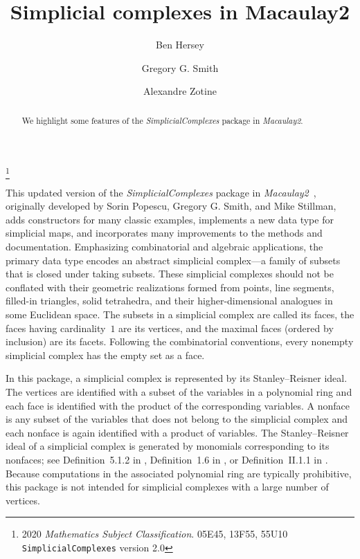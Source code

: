 \documentclass[12pt,leqno]{amsart}
\theoremstyle{definition}
\begin{document}
\vspace*{-4.5em}

\title[Simplicial Complexes]{Simplicial complexes in Macaulay2}

\author[B.~Hersey]{Ben Hersey}
\author[G.G.~Smith]{Gregory G.{} Smith} 
\author[A.~Zotine]{Alexandre Zotine}

\address{Department of Mathematics and Statistics, Queen's
  University, Kingston, Ontario, K7L 3N6
  {\normalfont\texttt{hersey.b@queensu.ca}},
  {\normalfont\texttt{ggsmith@mast.queensu.ca}},
  {\normalfont\texttt{18az45@queensu.ca}}.
}

\thanks{2020 \emph{Mathematics Subject Classification}. 05E45, 13F55,
  55U10\\
  \indent
  \texttt{SimplicialComplexes} version 2.0
}

\begin{abstract}
  We highlight some features of the \emph{SimplicialComplexes} package in
  \emph{Macaulay2}.
\end{abstract}

\maketitle

\vspace{-0.5em}

\noindent
This updated version of the \emph{SimplicialComplexes} package in
\emph{Macaulay2}~\cite{M2}, originally developed by Sorin Popescu, Gregory
G. Smith, and Mike Stillman, adds constructors for many classic examples,
implements a new data type for simplicial maps, and incorporates many
improvements to the methods and documentation.  Emphasizing combinatorial and
algebraic applications, the primary data type encodes an abstract simplicial
complex---a family of subsets that is closed under taking subsets.  These
simplicial complexes should not be conflated with their geometric realizations
formed from points, line segments, filled-in triangles, solid tetrahedra, and
their higher-dimensional analogues in some Euclidean space.  The subsets in a
simplicial complex are called its faces, the faces having cardinality~$1$ are
its vertices, and the maximal faces (ordered by inclusion) are its facets.
Following the combinatorial conventions, every nonempty simplicial complex has
the empty set as a face.

In this package, a simplicial complex is represented by its Stanley--Reisner
ideal. The vertices are identified with a subset of the variables in a
polynomial ring and each face is identified with the product of the
corresponding variables.  A nonface is any subset of the variables that does
not belong to the simplicial complex and each nonface is again identified with
a product of variables. The Stanley--Reisner ideal of a simplicial complex is
generated by monomials corresponding to its nonfaces; see Definition~5.1.2 in
\cite{BH}, Definition~1.6 in \cite{MS}, or Definition~II.1.1 in
\cite{Stanley}. Because computations in the associated polynomial ring are
typically prohibitive, this package is not intended for simplicial complexes
with a large number of vertices.
\end{document}
